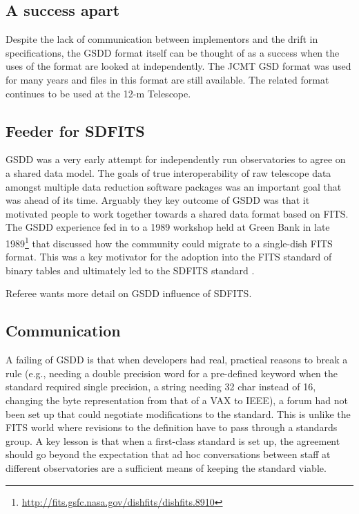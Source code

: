 \documentclass[final,authoryear,5p,times,twocolumn]{elsarticle}
\begin{document}
\subsection{A success apart}

Despite the lack of communication between implementors and the drift
in specifications, the GSDD format itself can be thought of as a
success when the uses of the format are looked at independently. The JCMT GSD
format was used for many years and files in this format are still
available. The related format continues to be used at the 12-m Telescope.


\subsection{Feeder for SDFITS}
\label{sec:sdfits}

GSDD was a very early attempt for independently run observatories to
agree on a shared data model. The goals of true interoperability of
raw telescope data amongst multiple data reduction software packages
was an important goal that was ahead of its time. Arguably they key
outcome of GSDD was that it motivated people to work together towards
a shared data format based on FITS. The GSDD experience fed in to a
1989 workshop held at Green Bank in late
1989\footnote{\url{http://fits.gsfc.nasa.gov/dishfits/dishfits.8910}}
that discussed how the community could migrate to a
single-dish FITS format. This was a key motivator for the adoption
into the FITS standard of binary tables \citep{1995A&AS..113..159C}
and ultimately led to the SDFITS standard \citep{2000ASPC..216..243G}.

{\color{red} Referee wants more detail on GSDD influence of SDFITS.}

\subsection{Communication}

A failing of GSDD is that when developers had real, practical reasons
to break a rule (e.g., needing a double precision word for a
pre-defined keyword when the standard required single precision, a
string needing 32 char instead of 16, changing the byte representation
from that of a VAX to IEEE), a forum had not been set up that could
negotiate modifications to the standard.  This is unlike the FITS
world where revisions to the definition have to pass through a
standards group.  A key lesson is that when a first-class standard is
set up, the agreement should go beyond the expectation that ad hoc
conversations between staff at different observatories are a
sufficient means of keeping the standard viable.
\end{document}
